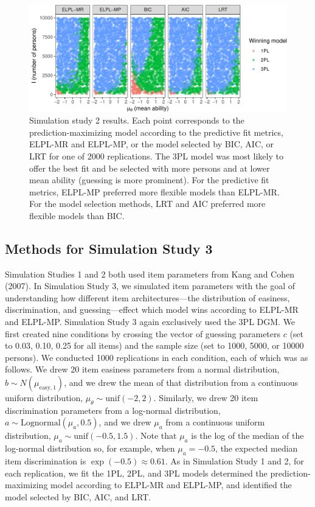 \documentclass[
  english,
  man,floatsintext]{apa7}
\begin{document}
\begin{figure}

{\centering \includegraphics[width=2100px]{irt-predictive-fit-apa_files/figure-latex/results4b-1}

}

\caption{Simulation study 2 results. Each point corresponds to the prediction-maximizing model according to the predictive fit metrics, ELPL-MR and ELPL-MP, or the model selected by BIC, AIC, or LRT for one of 2000 replications. The 3PL model was most likely to offer the best fit and be selected with more persons and at lower mean ability (guessing is more prominent). For the predictive fit metrics, ELPL-MP preferred more flexible models than ELPL-MR. For the model selection methods, LRT and AIC preferred more flexible models than BIC.}\label{fig:results4b}
\end{figure}

\hypertarget{methods-for-simulation-study-3}{%
\subsection{Methods for Simulation Study 3}\label{methods-for-simulation-study-3}}

Simulation Studies 1 and 2 both used item parameters from Kang and Cohen (2007). In Simulation Study 3, we simulated item parameters with the goal of understanding how different item architectures---the distribution of easiness, discrimination, and guessing---effect which model wins according to ELPL-MR and ELPL-MP. Simulation Study 3 again exclusively used the 3PL DGM. We first created nine conditions by crossing the vector of guessing parameters \(c\) (set to 0.03, 0.10, 0.25 for all items) and the sample size (set to 1000, 5000, or 10000 persons). We conducted 1000 replications in each condition, each of which was as follows. We drew 20 item easiness parameters from a normal distribution, \(b \sim N(\mu_{\text{easy}, 1})\), and we drew the mean of that distribution from a continuous uniform distribution, \(\mu_{\theta} \sim \text{unif}(-2, 2)\). Similarly, we drew 20 item discrimination parameters from a log-normal distribution, \(a \sim \text{Lognormal}(\mu_{a}, 0.5)\), and we drew \(\mu_{a}\) from a continuous uniform distribution, \(\mu_{a} \sim \text{unif}(-0.5, 1.5)\). Note that \(\mu_{a}\) is the log of the median of the log-normal distribution so, for example, when \(\mu_{a} = -0.5\), the expected median item discrimination is \(\exp(-0.5) \approx 0.61\). As in Simulation Study 1 and 2, for each replication, we fit the 1PL, 2PL, and 3PL models determined the prediction-maximizing model according to ELPL-MR and ELPL-MP, and identified the model selected by BIC, AIC, and LRT.
\end{document}
